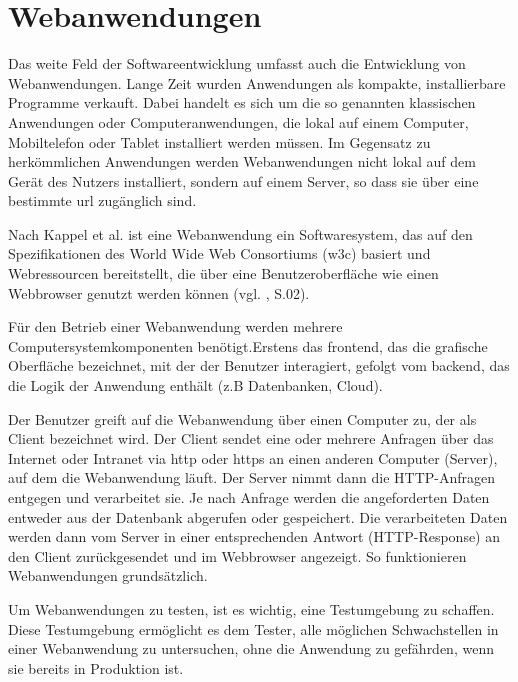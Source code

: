 \section{Webanwendungen}

Das weite Feld der Softwareentwicklung umfasst auch die
Entwicklung von Webanwendungen. Lange Zeit wurden
Anwendungen als kompakte, installierbare Programme
verkauft. Dabei handelt es sich um die so genannten
klassischen Anwendungen oder Computeranwendungen, die
lokal auf einem Computer, Mobiltelefon oder Tablet
installiert werden müssen. Im Gegensatz zu herkömmlichen
Anwendungen werden Webanwendungen nicht lokal auf dem Gerät
des Nutzers installiert, sondern auf einem Server, so dass
sie über eine bestimmte \acs{url} zugänglich sind.

Nach Kappel et al. ist eine Webanwendung ein Softwaresystem,
das auf den Spezifikationen des World Wide Web Consortiums
(\acs{w3c}) basiert und Webressourcen bereitstellt, die über
eine Benutzeroberfläche wie einen Webbrowser genutzt werden
können (vgl. \cite{kappel1}, S.02).

Für den Betrieb einer Webanwendung werden mehrere
Computersystemkomponenten benötigt.Erstens das \gls{frontend},
das die grafische Oberfläche bezeichnet, mit der der
Benutzer interagiert, gefolgt vom \gls{backend}, das die
Logik der Anwendung enthält (z.B Datenbanken, Cloud).


Der Benutzer greift auf die Webanwendung über einen Computer
zu, der als Client bezeichnet wird. Der Client sendet eine
oder mehrere Anfragen über das Internet oder Intranet via
\acs{http} oder \acs{https}  an einen anderen Computer (Server),
auf dem die Webanwendung läuft. Der Server nimmt dann die
HTTP-Anfragen entgegen und verarbeitet sie. Je nach Anfrage
werden die angeforderten Daten entweder aus der Datenbank
abgerufen oder gespeichert. Die verarbeiteten Daten werden
dann vom Server in einer entsprechenden Antwort
(HTTP-Response) an den Client zurückgesendet und im
Webbrowser angezeigt. So funktionieren Webanwendungen grundsätzlich.

Um Webanwendungen zu testen, ist es wichtig, eine Testumgebung zu schaffen.
Diese Testumgebung ermöglicht es dem Tester, alle möglichen Schwachstellen in einer Webanwendung zu untersuchen,
ohne die Anwendung zu gefährden, wenn sie bereits in Produktion ist.

